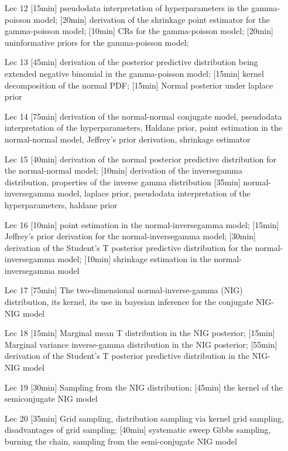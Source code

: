 \begin{enumerate}
\item[Lec 12] [15min] pseudodata interpretation of hyperparameters in the gamma-poisson model; [20min] derivation of the shrinkage point estimator for the gamma-poisson model; [10min] CRs for the gamma-poisson model; [20min] uninformative priors for the gamma-poisson model;

\item[Lec 13] [45min] derivation of the posterior predictive distribution being extended negative binomial in the gamma-poisson model; [15min] kernel decomposition of the normal PDF; [15min] Normal posterior under laplace prior


\item[Lec 14] [75min] derivation of the normal-normal conjugate model, pseudodata interpretation of the hyperparameters, Haldane prior, point estimation in the normal-normal model, Jeffrey's prior derivation, shrinkage estimator

\item[Lec 15] [40min] derivation of the normal posterior predictive distribution for the normal-normal model; [10min] derivation of the inversegamma distribution, properties of the inverse gamma distribution [35min] normal-inversegamma model, laplace prior, pseudodata interpretation of the hyperparameters, haldane prior

\item[Lec 16] [10min] point estimation in the normal-inversegamma model; [15min] Jeffrey's prior derivation for the normal-inversegamma model; [30min] derivation of the Student's T posterior predictive distribution for the normal-inversegamma model; [10min] shrinkage estimation in the normal-inversegamma model


\item[Lec 17] [75min] The two-dimensional  normal-inverse-gamma (NIG) distribution, its kernel, its use in bayesian inference for the conjugate NIG-NIG model

\item[Lec 18] [15min] Marginal mean T distribution in the NIG posterior; [15min] Marginal variance inverse-gamma distribution in the NIG posterior; [55min] derivation of the Student's T posterior predictive distribution in the NIG-NIG model

\item[Lec 19] [30min] Sampling from the NIG distribution; [45min] the kernel of the semiconjugate NIG model

\item[Lec 20] [35min] Grid sampling, distribution sampling via kernel grid sampling, disadvantages of grid sampling; [40min] systematic sweep Gibbs sampling, burning the chain, sampling from the semi-conjugate NIG model


\end{enumerate}
